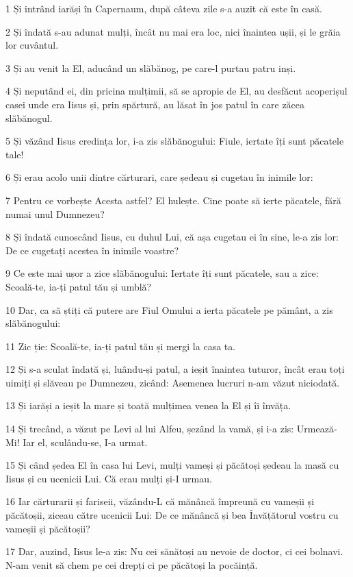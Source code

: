 \par 1 Și intrând iarăși în Capernaum, după câteva zile s-a auzit că este în casă.
\par 2 Și îndată s-au adunat mulți, încât nu mai era loc, nici înaintea ușii, și le grăia lor cuvântul.
\par 3 Și au venit la El, aducând un slăbănog, pe care-l purtau patru inși.
\par 4 Și neputând ei, din pricina mulțimii, să se apropie de El, au desfăcut acoperișul casei unde era Iisus și, prin spărtură, au lăsat în jos patul în care zăcea slăbănogul.
\par 5 Și văzând Iisus credința lor, i-a zis slăbănogului: Fiule, iertate îți sunt păcatele tale!
\par 6 Și erau acolo unii dintre cărturari, care ședeau și cugetau în inimile lor:
\par 7 Pentru ce vorbește Acesta astfel? El hulește. Cine poate să ierte păcatele, fără numai unul Dumnezeu?
\par 8 Și îndată cunoscând Iisus, cu duhul Lui, că așa cugetau ei în sine, le-a zis lor: De ce cugetați acestea în inimile voastre?
\par 9 Ce este mai ușor a zice slăbănogului: Iertate îți sunt păcatele, sau a zice: Scoală-te, ia-ți patul tău și umblă?
\par 10 Dar, ca să știți că putere are Fiul Omului a ierta păcatele pe pământ, a zis slăbănogului:
\par 11 Zic ție: Scoală-te, ia-ți patul tău și mergi la casa ta.
\par 12 Și s-a sculat îndată și, luându-și patul, a ieșit înaintea tuturor, încât erau toți uimiți și slăveau pe Dumnezeu, zicând: Asemenea lucruri n-am văzut niciodată.
\par 13 Și iarăși a ieșit la mare și toată mulțimea venea la El și îi învăța.
\par 14 Și trecând, a văzut pe Levi al lui Alfeu, șezând la vamă, și i-a zis: Urmează-Mi! Iar el, sculându-se, I-a urmat.
\par 15 Și când ședea El în casa lui Levi, mulți vameși și păcătoși ședeau la masă cu Iisus și cu ucenicii Lui. Că erau mulți și-I urmau.
\par 16 Iar cărturarii și fariseii, văzându-L că mănâncă împreună cu vameșii și păcătoșii, ziceau către ucenicii Lui: De ce mănâncă și bea Învățătorul vostru cu vameșii și păcătoșii?
\par 17 Dar, auzind, Iisus le-a zis: Nu cei sănătoși au nevoie de doctor, ci cei bolnavi. N-am venit să chem pe cei drepți ci pe păcătoși la pocăință.
